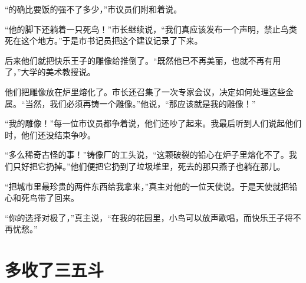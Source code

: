 \documentclass[12pt,UTF-8,openany]{ctexbook}
\begin{document}
\begin{normalsize}
    “的确比要饭的强不了多少，”市议员们附和着说。
    
    “他的脚下还躺着一只死鸟！”市长继续说，“我们真应该发布一个声明，禁止鸟类死在这个地方。”于是市书记员把这个建议记录了下来。
    
    后来他们就把快乐王子的雕像给推倒了。“既然他已不再美丽，也就不再有用了，”大学的美术教授说。
    
    他们把雕像放在炉里熔化了。市长还召集了一次专家会议，决定如何处理这些金属。“当然，我们必须再铸一个雕像。”他说，“那应该就是我的雕像！”
    
    “我的雕像！”每一位市议员都争着说，他们还吵了起来。我最后听到人们说起他们时，他们还没结束争吵。
    
    “多么稀奇古怪的事！”铸像厂的工头说，“这颗破裂的铅心在炉子里熔化不了。我们只好把它扔掉。”他们便把它扔到了垃圾堆里，死去的那只燕子也躺在那儿。
    
    “把城市里最珍贵的两件东西给我拿来，”真主对他的一位天使说。于是天使就把铅心和死鸟带了回来。
    
    “你的选择对极了，”真主说，“在我的花园里，小鸟可以放声歌唱，而快乐王子将不再忧愁。”
    
\end{normalsize}



\chapter{多收了三五斗}
\end{document}
